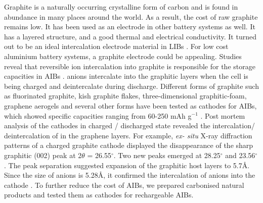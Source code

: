 Graphite is a naturally occurring crystalline form of carbon and is found in abundance in many places around the world. As a result, the cost of raw graphite remains low. It has been used as an electrode in other battery systems as well. It has a layered structure, and a good thermal and electrical conductivity. It turned out to be an ideal intercalation electrode material in LIBs \cite{ji_recent_2011, yoo_large_2008, lian_large_2010}. For low cost aluminium battery systems, a graphite electrode could be appealing. Studies reveal that reversible ion intercalation into graphite is responsible for the storage capacities in AIBs \cite{rani_fluorinated_2013-1, lin_ultrafast_2015-3}.  anions intercalate into the graphitic layers when the cell is being charged and deintercalate during discharge. Different forms of graphite such as fluorinated graphite, kish graphite flakes, three-dimensional graphitic-foam, graphene aerogels and several other forms have been tested as cathodes for AIBs, which showed specific capacities ranging from 60-250 mAh g$^{-1}$ \cite{rani_fluorinated_2013-1, wang_kish_2017-1, wu_3d_2016, huang_graphene_2019}. Post mortem analysis of the cathodes in charged / discharged state revealed the intercalation/ deintercalation of  in the graphene layers. For example, \textit{ex- situ} X-ray diffraction patterns of a charged graphite cathode displayed the disappearance of the sharp graphitic (002) peak at 2$\theta$ = 26.55$^{\circ}$. Two new peaks emerged at 28.25$^{\circ}$ and 23.56$^{\circ}$. The peak separation suggested expansion of the graphitic host layers to 5.7\AA. Since the size of  anions is 5.28\AA, it confirmed the intercalation of  anions into the cathode \cite{lin_ultrafast_2015-3, wang_kish_2017-1}. To further reduce the cost of AIBs, we prepared carbonised natural products and tested them as cathodes for rechargeable AIBs. 


